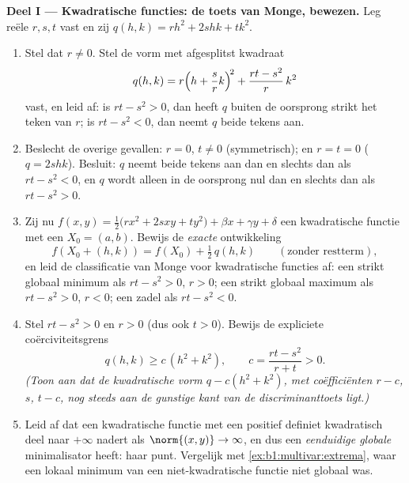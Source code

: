 \begin{problem}
\medskip
\noindent\textbf{Deel I --- Kwadratische functies: de toets van
Monge, bewezen.} Leg reële $r, s, t$ vast en zij $q(h, k) = r h^2 +
2s hk + t k^2$.
\begin{enumerate}
  \item Stel dat $r \neq 0$. Stel de vorm met afgesplitst kwadraat
        \[
        q(h, k) = r\Bigl(h + \frac{s}{r}k\Bigr)^{\!2}
        + \frac{rt - s^2}{r}\,k^2
        \]
        vast, en leid af: is $rt - s^2 > 0$, dan heeft $q$ buiten
        de oorsprong strikt het teken van $r$; is $rt - s^2 < 0$,
        dan neemt $q$ beide tekens aan.
  \item Beslecht de overige gevallen: $r = 0$, $t \neq 0$
        (symmetrisch); en $r = t = 0$ ($q = 2shk$). Besluit: $q$
        neemt beide tekens aan dan en slechts dan als $rt - s^2 <
        0$, en $q$ wordt alleen in de oorsprong nul dan en slechts
        dan als $rt - s^2 > 0$.
  \item Zij nu $f(x, y) = \frac12\bigl(r x^2 + 2s xy + t
        y^2\bigr) + \beta x + \gamma y + \delta$ een kwadratische
        functie met een  $X_0 = (a, b)$. Bewijs de
        \emph{exacte} ontwikkeling
        \[
        f(X_0 + (h,k)) = f(X_0) + \tfrac12\,q(h, k)
        \qquad (\text{zonder restterm}),
        \]
        en leid de classificatie van Monge voor kwadratische
        functies af: een strikt globaal minimum als $rt - s^2 >
        0$, $r > 0$; een strikt globaal maximum als $rt - s^2 >
        0$, $r < 0$; een zadel als $rt - s^2 < 0$.
  \item Stel $rt - s^2 > 0$ en $r > 0$ (dus ook $t > 0$). Bewijs de
        expliciete coërciviteitsgrens
        \[
        q(h, k) \geq c\,(h^2 + k^2),
        \qquad
        c = \frac{rt - s^2}{r + t} > 0 .
        \]
        \emph{(Toon aan dat de kwadratische vorm $q - c(h^2 +
        k^2)$, met coëfficiënten $r - c$, $s$, $t - c$, nog steeds
        aan de gunstige kant van de discriminanttoets ligt.)}
  \item Leid af dat een kwadratische functie met een positief
        definiet kwadratisch deel naar $+\infty$ nadert als
        $\norm{(x,y)} \to \infty$, en dus een \emph{eenduidige
        globale} minimalisator heeft: haar  punt.
        Vergelijk met \cref{ex:b1:multivar:extrema}, waar een
        lokaal minimum van een niet-kwadratische functie niet
        globaal was.
\end{enumerate}


\end{problem}
